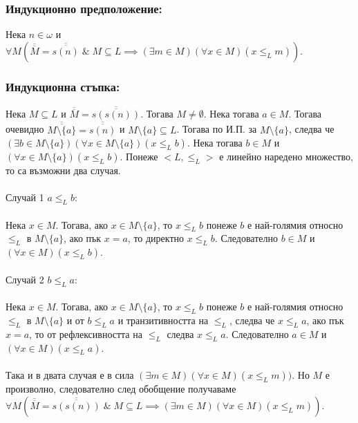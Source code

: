 \documentclass[12pt]{article}
\begin{document}
\subsubsection*{Индукционно предположение:}
Нека \(n \in \omega\) и 
\(\forall M (\overline{\overline{M}} = \overline{\overline{s(n)}} \; \& \; M \subseteq L \implies (\exists m \in M)(\forall x \in M)(x \leq_L m))\).

\subsubsection*{Индукционна стъпка:}
Нека \(M \subseteq L\) и \(\overline{\overline{M}} = \overline{\overline{s(s(n))}}\).
Тогава \(M \neq \emptyset\). Нека тогава \(a \in M\).
Тогава очевидно \(\overline{\overline{M \setminus \{a\}}} = \overline{\overline{s(n)}}\)
и \(M \setminus \{a\} \subseteq L\). Тогава по И.П. за \(M \setminus \{a\}\),
следва че \((\exists b \in M \setminus \{a\})(\forall x \in M \setminus \{a\})(x \leq_L b)\). Нека тогава \(b \in M\) и \((\forall x \in M \setminus \{a\})(x \leq_L b)\).
Понеже \(<L, \leq_L>\) е линейно наредено множество, то са възможни два случая.
\\
\vspace{1mm}
\\
Случай 1 \(a \leq_L b\):
\\
\vspace{1mm}
\\
Нека \(x \in M\). Тогава, ако \(x \in M \setminus \{a\}\), то \(x \leq_L b\) понеже
\(b\) е най-голямия относно \(\leq_L\) в \(M \setminus \{a\}\),
ако пък \(x = a\), то директно \(x \leq_L b\).
Следователно \(b \in M\) и \((\forall x \in M)(x \leq_L b)\).
\\
\vspace{1mm}
\\
Случай 2 \(b \leq_L a\):
\\
\vspace{1mm}
\\
Нека \(x \in M\). Тогава, ако \(x \in M \setminus \{a\}\), то \(x \leq_L b\) понеже
\(b\) е най-голямия относно \(\leq_L\) в \(M \setminus \{a\}\) и от \(b \leq_L a\) и транзитивността на \(\leq_L\), следва че \(x \leq_L a\),
ако пък \(x = a\), то от рефлексивността на \(\leq_L\) следва \(x \leq_L a\).
Следователно \(a \in M\) и \((\forall x \in M)(x \leq_L a)\).
\\
\vspace{1mm}
\\
Така и в двата случая е в сила \((\exists m \in M)(\forall x \in M)(x \leq_L m))\).
Но \(M\) е произволно, следователно след обобщение получаваме
\\
\(\forall M (\overline{\overline{M}} = \overline{\overline{s(s(n))}} \; \& \; M \subseteq L \implies (\exists m \in M)(\forall x \in M)(x \leq_L m))\).
\end{document}

